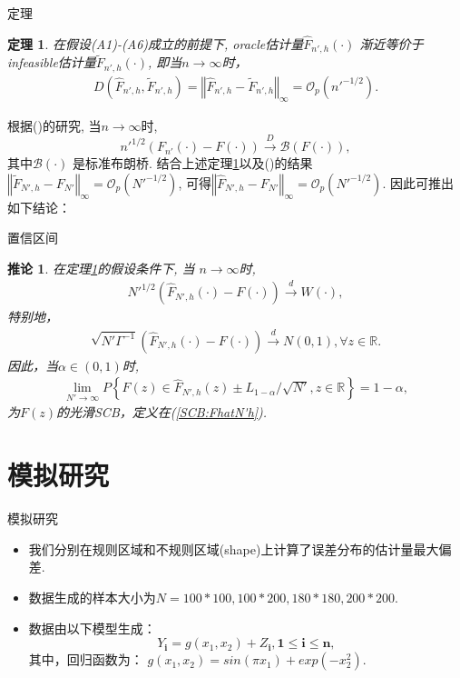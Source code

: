 \documentclass{beamer}
\newtheorem{thm}{定理}
\newtheorem{coro}{推论}
\begin{document}
\begin{frame}{定理\uppercase\expandafter{}}
\begin{thm} \label{THM:FhatFtilde}
在假设(A1)-(A6)成立的前提下, oracle估计量$\hat{F}_{n',h}(\cdot)$ 渐近等价于infeasible估计量$\tilde{F}_{n',h}(\cdot)$, 即当$n\to\infty$时，
\begin{align*}
    D\left(\hat{F}_{n',h}, \tilde{F}_{n',h}\right) = \left\Vert\hat{F}_{n',h} - \tilde{F}_{n',h}\right\Vert_{\infty} = {\scriptstyle{\mathcal{O}}}_{p}\left(n'^{-1/2}\right).
\end{align*}
\end{thm}
根据(\cite{fazekas2006asymptotic})的研究, 当$n\to\infty$时, \[
n'^{1/2}\left(F_{n'}(\cdot) - F(\cdot)\right) \overset{D}{\rightarrow} \mathcal{B}(F(\cdot)),
\]
其中$\mathcal{B}(\cdot)$ 是标准布朗桥.  
结合上述定理\ref{THM:FhatFtilde}以及(\cite{wang2013smooth})的结果$\left\Vert\tilde{F}_{N',h} - F_{N'}\right\Vert_{\infty} = {\scriptstyle{\mathcal{O}}}_{p}\left(N'^{-1/2}\right)$, 可得$\left\Vert\hat{F}_{N',h} - F_{N'}\right\Vert_{\infty}={\scriptstyle{\mathcal{O}}}_{p}\left(N'^{-1/2}\right)$. 因此可推出如下结论：
\end{frame}

\begin{frame}{置信区间}
    \begin{coro}
  在定理\ref{THM:FhatFtilde}的假设条件下, 当 $n \to \infty$时,
    \begin{align*}
           N'^{1/2}\left(\hat{F}_{N',h}(\cdot)-F(\cdot)\right)\overset{d}{\rightarrow} W(\cdot),  
    \end{align*}
特别地，
\begin{align*}
    \sqrt{N'\Gamma^{-1}}\left(\hat{F}_{N',h}(\cdot)-F(\cdot)\right)\overset{d}{\rightarrow} N(0,1),\forall z \in \mathbb{R}.
\end{align*}
因此，当$\alpha \in (0,1)$时,
\begin{align*}
    \lim_{N' \to \infty}P\left\{F(z) \in \hat{F}_{N',h}(z) \pm L_{1-\alpha}/\sqrt{N'}, z\in  \mathbb{R}\right\}=1-\alpha,
\end{align*}
 为$F(z)$的光滑SCB，定义在(\ref{SCB:FhatN'h}).
\end{coro}
\end{frame}


\section{模拟研究}
\begin{frame}{模拟研究}
\begin{itemize}
    \item 我们分别在规则区域和不规则区域(shape)上计算了误差分布的估计量最大偏差.

    \item 数据生成的样本大小为$N=100*100, 100*200, 180*180, 200*200$.

    \item 数据由以下模型生成：
        $$Y_{\mathbf{i}} = g(x_1,x_2)+Z_{\mathbf{i}},\mathbf{1}\leq \mathbf{i}\leq \mathbf{n},$$
其中，回归函数为： $g(x_1,x_2) = sin(\pi x_1)+exp(-x_2^2)$.
\end{itemize}
\end{frame}
\end{document}
